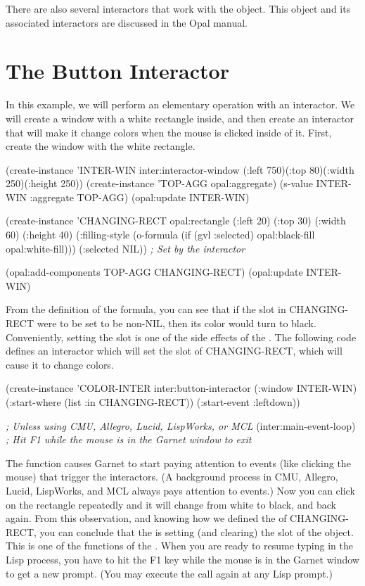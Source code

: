 There are also several interactors that work with the 
object.  This object and its associated interactors are discussed in
the Opal manual.


\section{The Button Interactor}

In this example, we will perform an elementary operation with an
interactor.  We will create a window with a white rectangle inside,
and then create an interactor that will make it change colors when
the mouse is clicked inside of it.  First, create the window with the
white rectangle.

\begin{programexample}
(create-instance 'INTER-WIN inter:interactor-window
   (:left 750)(:top 80)(:width 250)(:height 250))
(create-instance 'TOP-AGG opal:aggregate)
(s-value INTER-WIN :aggregate TOP-AGG)
(opal:update INTER-WIN)

(create-instance 'CHANGING-RECT opal:rectangle
   (:left 20) (:top 30)
   (:width 60) (:height 40)
   (:filling-style (o-formula (if (gvl :selected)
				  opal:black-fill
				  opal:white-fill)))
   (:selected NIL))  {\it ; Set by the interactor}

(opal:add-components TOP-AGG CHANGING-RECT)
(opal:update INTER-WIN)
\end{programexample}

From the definition of the  formula, you can see
that if the  slot in CHANGING-RECT were to be set to be
non-NIL, then its color would turn to black.  Conveniently, setting the
 slot is one of the side effects of the
. The following code defines an interactor which
will set the  slot of CHANGING-RECT, which will cause it
to change colors.

\begin{programexample}
(create-instance 'COLOR-INTER inter:button-interactor
   (:window INTER-WIN)
   (:start-where (list :in CHANGING-RECT))
   (:start-event :leftdown))

{\it ; Unless using CMU, Allegro, Lucid, LispWorks, or MCL}
(inter:main-event-loop)
{\it ; Hit F1 while the mouse is in the Garnet window to exit}
\end{programexample}

The  function causes Garnet to start paying
attention to events (like clicking the mouse) that trigger the interactors.
(A background process in CMU, Allegro, Lucid, LispWorks, and MCL always
pays attention to events.)
Now you can click on the rectangle
repeatedly and it will change from white to black, and back again.
From this observation, and knowing how we defined the
 of CHANGING-RECT, you can conclude that the
 is setting (and clearing) the 
slot of the object.  This is one of the functions of the
.
When you are ready to resume typing in the Lisp process, you have to
hit the F1 key while the mouse is in the Garnet window to get a new
prompt.  (You may execute the  call again at any
Lisp prompt.)

